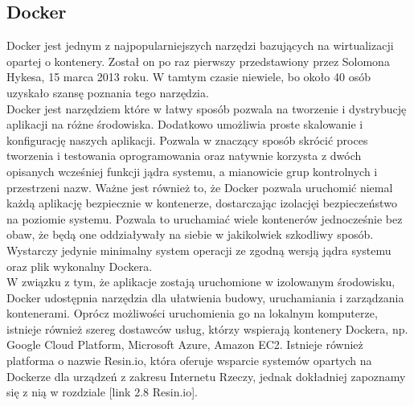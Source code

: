 \documentclass[12pt]{report}
\let\Oldsubsection\subsection
\renewcommand{\subsection}{\FloatBarrier\Oldsubsection}
\begin{document}
\subsection{Docker}
Docker jest jednym z najpopularniejszych narzędzi bazujących na wirtualizacji opartej o kontenery. Został on po raz pierwszy przedstawiony przez Solomona Hykesa, 15 marca 2013 roku. W tamtym czasie niewiele, bo około 40 osób uzyskało szansę poznania tego narzędzia. \\
\indent Docker jest narzędziem które w łatwy sposób pozwala na tworzenie i dystrybucję aplikacji na różne środowiska. Dodatkowo umożliwia proste skalowanie i konfigurację naszych aplikacji. Pozwala w znaczący sposób skrócić proces tworzenia i testowania oprogramowania oraz natywnie korzysta z dwóch opisanych wcześniej funkcji jądra systemu, a mianowicie grup kontrolnych i przestrzeni nazw. Ważne jest również to, że Docker pozwala uruchomić niemal każdą aplikację bezpiecznie w kontenerze, dostarczając izolacjęi bezpieczeństwo na poziomie systemu. Pozwala to uruchamiać wiele kontenerów jednocześnie bez obaw, że będą one oddziaływały na siebie w jakikolwiek szkodliwy sposób. Wystarczy jedynie minimalny system operacji ze zgodną wersją jądra systemu oraz plik wykonalny Dockera. \\
\indent W związku z tym, że aplikacje zostają uruchomione w izolowanym środowisku, Docker udostępnia narzędzia dla ułatwienia budowy, uruchamiania i zarządzania kontenerami. Oprócz możliwości uruchomienia go na lokalnym komputerze, istnieje również szereg dostawców usług, którzy wspierają kontenery Dockera, np. Google Cloud Platform, Microsoft Azure, Amazon EC2. Istnieje również platforma o nazwie Resin.io, która oferuje wsparcie systemów opartych na Dockerze dla urządzeń z zakresu Internetu Rzeczy, jednak dokładniej zapoznamy się z nią w rozdziale [link 2.8 Resin.io].
\end{document}
